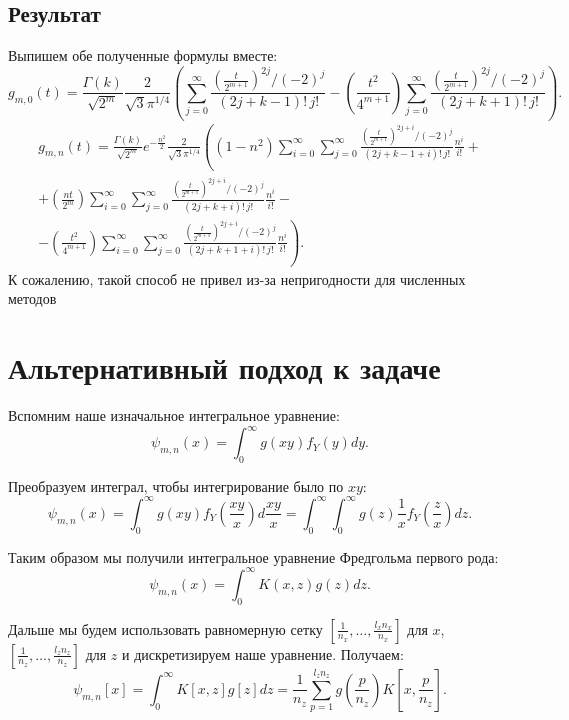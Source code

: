 \documentclass[12pt, a4paper]{report}
\begin{document}
\section{Результат}
Выпишем обе полученные формулы вместе:
\[
    g_{m,0}(t) =
%
    \frac{\Gamma(k)}{\sqrt{2^m}}
    \frac{2}{\sqrt{3} \pi^{1/4}} \left(
%
    \sum_{j=0}^{\infty} \frac{\left(\frac{t}{2^{m+1}}\right)^{2j} / (-2)^j}{(2j+k-1)!\,j!}
-
    \left( \frac{t^2}{4^{m+1}} \right) 
    \sum_{j=0}^{\infty} \frac{\left(\frac{t}{2^{m+1}}\right)^{2j} / (-2)^j}{(2j+k+1)!\,j!}
%
    \right)
.\]
\begin{multline*}
    g_{m,n}(t)
=
    \frac{\Gamma(k)}{\sqrt{2^m}} e^{-\frac{n^2}{2}} \frac{2}{\sqrt{3} \pi^{1/4}} \left(
    \left( 1-n^2 \right) 
    \sum_{i=0}^{\infty} \sum_{j=0}^{\infty} \frac{\left( \frac{t}{2^{m+1}} \right) ^{2j+i} / (-2)^j}{(2j+k-1+i)!\,j!} \frac{n^i}{i!}
\right. +\\+
    \left( \frac{nt}{2^m} \right) 
    \sum_{i=0}^{\infty} \sum_{j=0}^{\infty} \frac{\left( \frac{t}{2^{m+1}} \right) ^{2j+i} / (-2)^j}{(2j+k+i)!\,j!} \frac{n^i}{i!}
-\\- \left.
    \left( \frac{t^2}{4^{m+1}} \right) 
    \sum_{i=0}^{\infty} \sum_{j=0}^{\infty} \frac{\left( \frac{t}{2^{m+1}} \right) ^{2j+i} / (-2)^j}{(2j+k+1+i)!\,j!} \frac{n^i}{i!}
    \right)
.\end{multline*}
%
К сожалению, такой способ не привел из-за непригодности для численных методов
%
\chapter{Альтернативный подход к задаче}
Вспомним наше изначальное интегральное уравнение:
\[
    \psi_{m,n}(x) = \int_{0}^{\infty} g(xy) f_Y(y) dy  
.\]

Преобразуем интеграл, чтобы интегрирование было по $xy$:
\[
    \psi_{m,n}(x) = \int_{0}^{\infty}  g(xy) f_Y(\frac{xy}{x}) d\frac{xy}{x}
    = \int_{0}^{\infty} \int_{0}^{\infty} g(z) \frac{1}{x} f_Y(\frac{z}{x}) dz  
.\]

Таким образом мы получили интегральное уравнение Фредгольма первого рода:
\[
    \psi_{m,n}(x) = \int_{0}^{\infty} K(x, z) g(z) dz 
.\]

Дальше мы будем использовать равномерную сетку $\left[\frac{1}{n_x}, \dots, \frac{l_x n_x}{n_x}\right]$ для $x$, $\left[\frac{1}{n_z}, \dots, \frac{l_z n_z}{n_z}\right]$ для $z$ 
и дискретизируем наше уравнение. Получаем:
\[
    \psi_{m,n}[x] = \int_{0}^{\infty} K[x,z] g[z] dz = \frac{1}{n_z} \sum_{p=1}^{l_z n_z} g\left(\frac{p}{n_z}\right) K\left[x, \frac{p}{n_z}\right]
.\]
\end{document}

